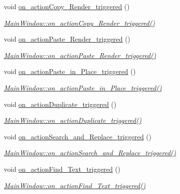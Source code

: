 \begin{DoxyCompactItemize}
void \hyperlink{class_main_window_a5e9b919e05294457c7ea69f11afa0af8}{on\+\_\+action\+Copy\+\_\+\+Render\+\_\+triggered} ()
\begin{DoxyCompactList}\small\item\em \hyperlink{class_main_window_a5e9b919e05294457c7ea69f11afa0af8}{Main\+Window\+::on\+\_\+action\+Copy\+\_\+\+Render\+\_\+triggered()} \end{DoxyCompactList}\item 
void \hyperlink{class_main_window_a8587cd1f94682b6ac53b321b632e1220}{on\+\_\+action\+Paste\+\_\+\+Render\+\_\+triggered} ()
\begin{DoxyCompactList}\small\item\em \hyperlink{class_main_window_a8587cd1f94682b6ac53b321b632e1220}{Main\+Window\+::on\+\_\+action\+Paste\+\_\+\+Render\+\_\+triggered()} \end{DoxyCompactList}\item 
void \hyperlink{class_main_window_a675facd954ba9ceb4af6b3496a7db66e}{on\+\_\+action\+Paste\+\_\+in\+\_\+\+Place\+\_\+triggered} ()
\begin{DoxyCompactList}\small\item\em \hyperlink{class_main_window_a675facd954ba9ceb4af6b3496a7db66e}{Main\+Window\+::on\+\_\+action\+Paste\+\_\+in\+\_\+\+Place\+\_\+triggered()} \end{DoxyCompactList}\item 
void \hyperlink{class_main_window_af5060bd55fe1e9a7196be8a2dab1622e}{on\+\_\+action\+Duplicate\+\_\+triggered} ()
\begin{DoxyCompactList}\small\item\em \hyperlink{class_main_window_af5060bd55fe1e9a7196be8a2dab1622e}{Main\+Window\+::on\+\_\+action\+Duplicate\+\_\+triggered()} \end{DoxyCompactList}\item 
void \hyperlink{class_main_window_a8447eeb10a01419b396f470c0745ec01}{on\+\_\+action\+Search\+\_\+and\+\_\+\+Replace\+\_\+triggered} ()
\begin{DoxyCompactList}\small\item\em \hyperlink{class_main_window_a8447eeb10a01419b396f470c0745ec01}{Main\+Window\+::on\+\_\+action\+Search\+\_\+and\+\_\+\+Replace\+\_\+triggered()} \end{DoxyCompactList}\item 
void \hyperlink{class_main_window_a83f715fceb4ae6b29bc3dbf86260b580}{on\+\_\+action\+Find\+\_\+\+Text\+\_\+triggered} ()
\begin{DoxyCompactList}\small\item\em \hyperlink{class_main_window_a83f715fceb4ae6b29bc3dbf86260b580}{Main\+Window\+::on\+\_\+action\+Find\+\_\+\+Text\+\_\+triggered()} \end{DoxyCompactList}\item 

\end{DoxyCompactItemize}
